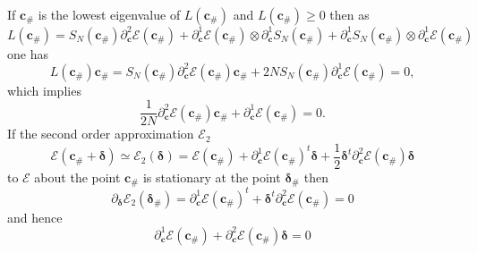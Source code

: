 \documentclass[aps,preprint]{revtex4}%
\begin{document}
If $\mathbf{c}_{\#}$ is the lowest eigenvalue of $L\left(  \mathbf{c}%
_{\#}\right)  $ and $L\left(  \mathbf{c}_{\#}\right)  \geq0$ then as
\begin{equation}
L\left(  \mathbf{c}_{\#}\right)  =S_{N}\left(  \mathbf{c}_{\#}\right)
\partial_{\mathbf{c}}^{2}\mathcal{E}\left(  \mathbf{c}_{\#}\right)
+\partial_{\mathbf{c}}^{1}\mathcal{E}\left(  \mathbf{c}_{\#}\right)
\otimes\partial_{\mathbf{c}}^{1}S_{N}\left(  \mathbf{c}_{\#}\right)
+\partial_{\mathbf{c}}^{1}S_{N}\left(  \mathbf{c}_{\#}\right)  \otimes
\partial_{\mathbf{c}}^{1}\mathcal{E}\left(  \mathbf{c}_{\#}\right)
\end{equation}
one has
\begin{equation}
L\left(  \mathbf{c}_{\#}\right)  \mathbf{c}_{\#}=S_{N}\left(  \mathbf{c}%
_{\#}\right)  \partial_{\mathbf{c}}^{2}\mathcal{E}\left(  \mathbf{c}%
_{\#}\right)  \mathbf{c}_{\#}+2NS_{N}\left(  \mathbf{c}_{\#}\right)
\partial_{\mathbf{c}}^{1}\mathcal{E}\left(  \mathbf{c}_{\#}\right)  =0,
\end{equation}
which implies
\begin{equation}
\frac{1}{2N}\partial_{\mathbf{c}}^{2}\mathcal{E}\left(  \mathbf{c}%
_{\#}\right)  \mathbf{c}_{\#}+\partial_{\mathbf{c}}^{1}\mathcal{E}\left(
\mathbf{c}_{\#}\right)  =0. \label{stat1}%
\end{equation}
If the second order approximation $\mathcal{E}_{2}$
\begin{equation}
\mathcal{E}\left(  \mathbf{c}_{\#}+\mathbf{\delta}\right)  \simeq
\mathcal{E}_{2}\left(  \mathbf{\delta}\right)  =\mathcal{E}\left(
\mathbf{c}_{\#}\right)  +\partial_{\mathbf{c}}^{1}\mathcal{E}\left(
\mathbf{c}_{\#}\right)  ^{t}\mathbf{\delta+}\frac{1}{2}\mathbf{\delta}%
^{t}\partial_{\mathbf{c}}^{2}\mathcal{E}\left(  \mathbf{c}_{\#}\right)
\mathbf{\delta}%
\end{equation}
to $\mathcal{E}$ about the point $\mathbf{c}_{\#}$ is stationary at the point
$\mathbf{\delta}_{\#}$ then
\begin{equation}
\partial_{\mathbf{\delta}}\mathcal{E}_{2}\left(  \mathbf{\delta}_{\#}\right)
=\partial_{\mathbf{c}}^{1}\mathcal{E}\left(  \mathbf{c}_{\#}\right)
^{t}+\mathbf{\delta}^{t}\partial_{\mathbf{c}}^{2}\mathcal{E}\left(
\mathbf{c}_{\#}\right)  =0
\end{equation}
and hence
\begin{equation}
\partial_{\mathbf{c}}^{1}\mathcal{E}\left(  \mathbf{c}_{\#}\right)
+\partial_{\mathbf{c}}^{2}\mathcal{E}\left(  \mathbf{c}_{\#}\right)
\mathbf{\delta}=0 \label{stat2}%
\end{equation}
\end{document}
